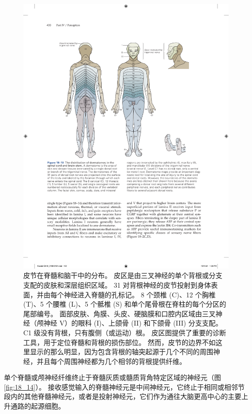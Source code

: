 \begin{figure}[htbp]
	\centering
	\includegraphics[width=1.0\linewidth]{chap18/fig_18_13}
	\caption{皮节在脊髓和脑干中的分布。 
		皮区是由三叉神经的单个背根或分支支配的皮肤和深层组织区域。 
		31 对背根神经的皮节投射到身体表面，并由每个神经进入脊髓的孔标记。 
		8 个颈椎 (C)、12 个胸椎 (T)、5 个腰椎 (L)、5 个骶椎 (S) 和单个尾骨根在脊柱的每个分区的尾部编号。 
		面部皮肤、角膜、头皮、硬脑膜和口腔内区域由三叉神经（颅神经 V）的眼科 (I)、上颌骨 (II) 和下颌骨 (III) 分支支配。 
		C1 级没有背根，只有腹侧（或运动）根。 
		皮区图提供了重要的诊断工具，用于定位脊髓和背根的损伤部位。 
		然而，皮节的边界不如这里显示的那么明显，因为包含背根的轴突起源于几个不同的周围神经，并且每个周围神经都为几个相邻的背根提供纤维。}
	\label{fig:18_13}
\end{figure}

单个脊髓或颅神经纤维终止于脊髓灰质或髓质背角特定区域的神经元（图 \ref{fig:18_14}）。 
接收感觉输入的脊髓神经元是中间神经元，它终止于相同或相邻节段内的其他脊髓神经元，或者是投射神经元，它们作为通往大脑更高中心的主要上升通路的起源细胞。


